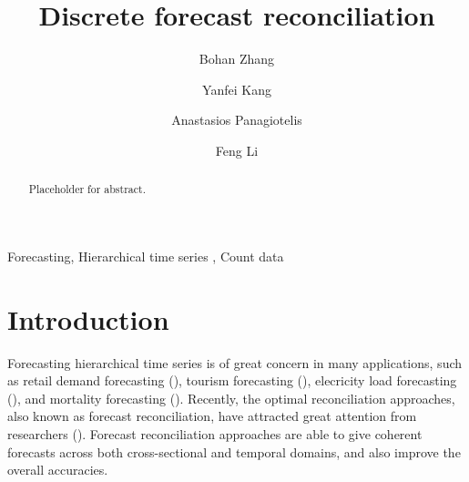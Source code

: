 \documentclass[a4paper,review,12pt,authoryear]{elsarticle}
\begin{document}
\begin{frontmatter}

  \title{Discrete forecast reconciliation}

  \author[label1]{Bohan Zhang}
  \address[label1]{School of Economics and Management, Beihang University, Beijing, China}
  
  \author[label1]{Yanfei Kang}
  \author[label2]{Anastasios Panagiotelis}
  
  \author[label3]{Feng Li}

  \address[label2]{The University of Sydney Business School, NSW 2006, Australia}
  \address[label3]{School of Statistics and Mathematics, Central University of Finance and Economics, Beijing, China}

  \begin{abstract}
    Placeholder for abstract.
  \end{abstract}

  \begin{keyword}
  Forecasting\sep
  Hierarchical time series \sep
  Count data
  \end{keyword}
  
\end{frontmatter}

\newpage

\section{Introduction}

Forecasting hierarchical time series is of great concern in many applications, such as retail demand forecasting (\citealp{babaiDemandForecastingSupply2022}), tourism forecasting (\citealp{kourentzesCrosstemporalCoherentForecasts2019}), elecricity load forecasting (\citealp{nystrupTemporalHierarchiesAutocorrelation2020}), and mortality forecasting (\citealp{liHierarchicalMortalityForecasting2022}).
Recently, the optimal reconciliation approaches, also known as forecast reconciliation, have attracted great attention from researchers (\citealp{hyndmanOptimalCombinationForecasts2011, wickramasuriyaOptimalForecastReconciliation2019,zhangOptimalReconciliationImmutable2022a}). 
Forecast reconciliation approaches are able to give coherent forecasts across both cross-sectional and temporal domains, and also improve the overall accuracies.
\end{document}
